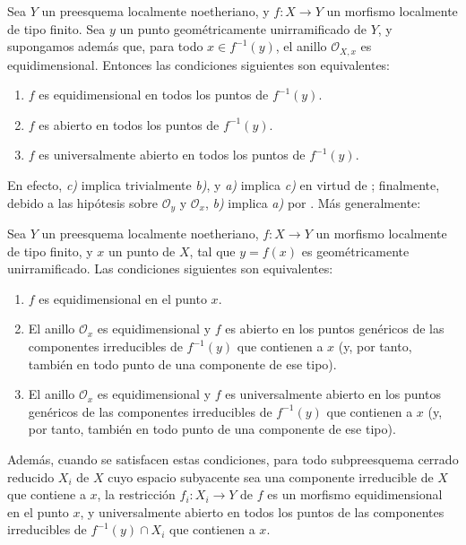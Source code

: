 \begin{corollary}[14.4.6]
\label{IV.14.4.6}

Sea $Y$ un preesquema localmente noetheriano, y $f:X\to Y$ un morfismo localmente de tipo finito.
Sea $y$ un punto geométricamente unirramificado de $Y$, y supongamos además que, para todo $x\in f^{-1}(y)$, el anillo $\mathcal O_{X,x}$ es equidimensional.
Entonces las condiciones siguientes son equivalentes:
\begin{enumerate}[label=\emph{\alph*)}]
  \item $f$ es equidimensional  en todos los puntos de $f^{-1}(y)$.
  \item $f$ es abierto en todos los puntos de $f^{-1}(y)$.
  \item $f$ es universalmente abierto en todos los puntos de $f^{-1}(y)$.
\end{enumerate}
\end{corollary}

En efecto, \emph{c)} implica trivialmente \emph{b)}, y \emph{a)} implica \emph{c)} en virtud de ; finalmente, debido a las hipótesis sobre $\mathcal O_y$ y $\mathcal O_x$, \emph{b)} implica \emph{a)} por .
Más generalmente:

\begin{proposition}[14.4.7]
\label{IV.14.4.7}
Sea $Y$ un preesquema localmente noetheriano, $f:X\to Y$ un morfismo localmente de tipo finito, y $x$ un punto de $X$, tal que $y=f(x)$ es geométricamente unirramificado.
Las condiciones siguientes son equivalentes:
\begin{enumerate}[label=\emph{\alph*)}]
  \item $f$ es equidimensional  en el punto $x$.
  \item El anillo $\mathcal O_x$ es equidimensional y $f$ es abierto en los puntos genéricos de las componentes irreducibles de $f^{-1}(y)$ que contienen a $x$ (y, por tanto, también en todo punto de una componente de ese tipo).
  \item El anillo $\mathcal O_x$ es equidimensional y $f$ es universalmente abierto en los puntos genéricos de las componentes irreducibles de $f^{-1}(y)$ que contienen a $x$ (y, por tanto, también en todo punto de una componente de ese tipo).
\end{enumerate}
Además, cuando se satisfacen estas condiciones, para todo subpreesquema cerrado reducido $X_i$ de $X$ cuyo espacio subyacente sea una componente irreducible de $X$ que contiene a $x$, la restricción $f_i:X_i\to Y$ de $f$ es un morfismo equidimensional en el punto $x$, y universalmente abierto en todos los puntos de las componentes irreducibles de $f^{-1}(y)\cap X_i$ que contienen a $x$.
\end{proposition}

